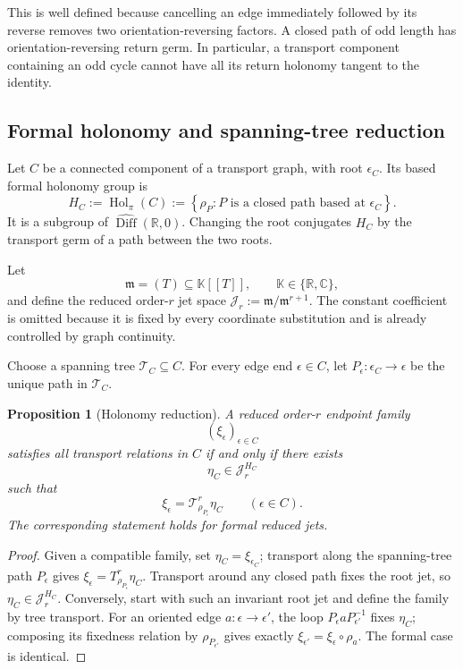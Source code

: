 \documentclass[11pt]{article}
\theoremstyle{plain}
\newtheorem{proposition}[theorem]{Proposition}
\theoremstyle{definition}
\begin{document}
This is well defined because cancelling an edge immediately followed
by its reverse removes two orientation-reversing factors. A closed
path of odd length has orientation-reversing return germ. In
particular, a transport component containing an odd cycle cannot have
all its return holonomy tangent to the identity.

\subsection{Formal holonomy and spanning-tree reduction}
\label{subsec:holonomy-reduction}

Let \(C\) be a connected component of a transport graph, with root
\(\epsilon_C\). Its based formal holonomy group is
\[
  H_C
  :=
  \operatorname{Hol}_\pi(C)
  :=
  \left\{
    \rho_P:
    P
    \text{ is a closed path based at }
    \epsilon_C
  \right\}.
\]
It is a subgroup of
\(\widehat{\operatorname{Diff}}(\mathbb R,0)\).
Changing the root conjugates \(H_C\) by the transport germ of a path
between the two roots.

Let
\[
  \mathfrak m=(T)\subseteq\mathbb K[[T]],
  \qquad
  \mathbb K\in\{\mathbb R,\mathbb C\},
\]
and define the reduced order-\(r\) jet space
\(\mathcal J_r := \mathfrak m/\mathfrak m^{r+1}\).
The constant coefficient is omitted because it is fixed by every
coordinate substitution and is already controlled by graph
continuity.

Choose a spanning tree
\(\mathcal T_C\subseteq C\).
For every edge end \(\epsilon\in C\), let \(P_\epsilon: \epsilon_C\longrightarrow\epsilon\) be the unique path in \(\mathcal T_C\).

\begin{proposition}[Holonomy reduction]
\label{prop:graph-holonomy-reduction}
A reduced order-\(r\) endpoint family
\[
  (\xi_\epsilon)_{\epsilon\in C}
\]
satisfies all transport relations in \(C\) if and only if there exists
\[
  \eta_C\in\mathcal J_r^{H_C}
\]
such that
\[
  \boxed{
  \xi_\epsilon
  =
  \mathcal T_{\rho_{P_\epsilon}}^r\eta_C
  \qquad
  (\epsilon\in C).
  }
\]
The corresponding statement holds for formal reduced jets.
\end{proposition}

\begin{proof}
Given a compatible family, set \(\eta_C=\xi_{\epsilon_C}\); transport along the spanning-tree path \(P_\epsilon\) gives \(\xi_\epsilon=T_{\rho_{P_\epsilon}}^r\eta_C\). Transport around any closed path fixes the root jet, so \(\eta_C\in\mathcal J_r^{H_C}\). Conversely, start with such an invariant root jet and define the family by tree transport. For an oriented edge \(a:\epsilon\to\epsilon'\), the loop \(P_\epsilon aP_{\epsilon'}^{-1}\) fixes \(\eta_C\); composing its fixedness relation by \(\rho_{P_{\epsilon'}}\) gives exactly \(\xi_{\epsilon'}=\xi_\epsilon\circ\rho_a\). The formal case is identical.
\end{proof}
\end{document}
